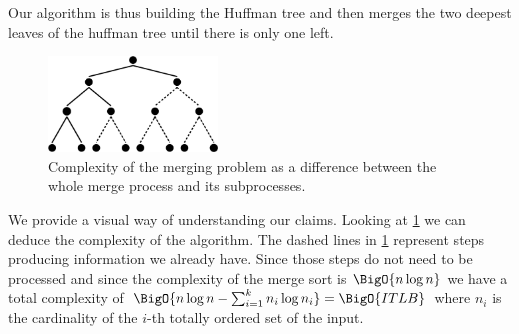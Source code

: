 Our algorithm is thus building the Huffman tree and then merges the two deepest
leaves of the huffman tree until there is only one left.

\begin{figure}
	\centering
	\includegraphics[width=0.4\textwidth]{fig/merging/huffman-2-trim}
	\caption{Complexity of the merging problem as a difference between the whole merge process and its subprocesses.}
	\label{tree:merging:fig/huffman-2}
\end{figure}

We provide a visual way of understanding our claims. Looking at
\ref{tree:merging:fig/huffman-2} we can deduce the complexity of the algorithm.
The dashed lines in \ref{tree:merging:fig/huffman-2} represent steps producing
information we already have. Since those steps do not need to be processed and
since the complexity of the merge sort is $\BigO{n \log n}$ we have a total
complexity of $\BigO{n \log n - \sum_{i=1}^{k} n_i \log n_i} = \BigO{ITLB}$
where $n_i$ is the cardinality of the $i$-th totally ordered set of the input.
